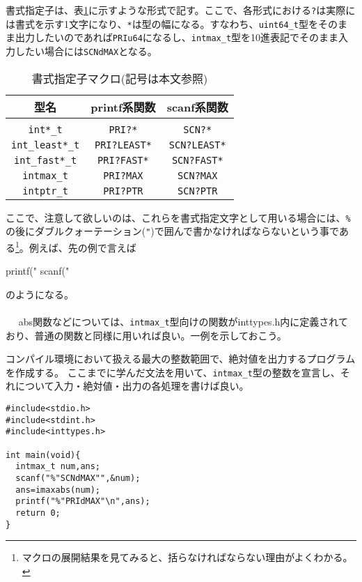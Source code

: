 書式指定子は、表\ref{inttypes_macro}に示すような形式で記す。ここで、各形式における\verb|?|は実際には書式を示す1文字になり、\verb|*|は型の幅になる。すなわち、\verb|uint64_t|型をそのまま出力したいのであれば\verb|PRIu64|になるし、\verb|intmax_t|型を10進表記でそのまま入力したい場合には\verb|SCNdMAX|となる。
\begin{table}[htb]
\centering
\caption{書式指定子マクロ(記号は本文参照)}\label{inttypes_macro}
\begin{tabular}{|c||c|c|}\hline
型名&printf系関数&scanf系関数\\ \hline
&&\\[-15.5pt] \hline
\verb|int*_t|&\verb|PRI?*|&\verb|SCN?*|\\ \hline
\verb|int_least*_t|&\verb|PRI?LEAST*|&\verb|SCN?LEAST*|\\ \hline
\verb|int_fast*_t|&\verb|PRI?FAST*|&\verb|SCN?FAST*|\\ \hline
\verb|intmax_t|&\verb|PRI?MAX|&\verb|SCN?MAX|\\ \hline
\verb|intptr_t|&\verb|PRI?PTR|&\verb|SCN?PTR|\\ \hline
\end{tabular}
\end{table}

ここで、注意して欲しいのは、これらを書式指定文字として用いる場合には、\verb|%|の後にダブルクォーテーション(\verb|"|)で囲んで書かなければならないという事である\footnote{マクロの展開結果を見てみると、括らなければならない理由がよくわかる。}。例えば、先の例で言えば
\begin{code}
printf("%
scanf("%
\end{code}
のようになる。
\\ \\　
abs関数などについては、\verb|intmax_t|型向けの関数がinttypes.h内に定義されており、普通の関数と同様に用いれば良い。一例を示しておこう。
\begin{boxnote}
\begin{multicols}{2}
コンパイル環境において扱える最大の整数範囲で、絶対値を出力するプログラムを作成する。
ここまでに学んだ文法を用いて、\verb|intmax_t|型の整数を宣言し、それについて入力・絶対値・出力の各処理を書けば良い。
\begin{lstlisting}[caption=最大範囲の絶対値,label=program7_4]
#include<stdio.h>
#include<stdint.h>
#include<inttypes.h>

int main(void){
  intmax_t num,ans;
  scanf("%"SCNdMAX"",&num);
  ans=imaxabs(num);
  printf("%"PRIdMAX"\n",ans);
  return 0;
}
\end{lstlisting}
\end{multicols}
\end{boxnote}

